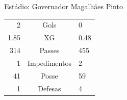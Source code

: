 \documentclass[11pt]{article}
\begin{document}
\vspace{0.5cm}
\begin{minipage}{0.65\textwidth}
\begin{center}
\begin{tabular}{rl}
\end{tabular}
\end{center}
\end{minipage}
\begin{minipage}{0.3\textwidth}
Estádio: Governador Magalhães Pinto\\
\begin{tabular}{rcl}
2 & Gols & 0 \\
1.85 & XG & 0.48 \\
314 & Passes & 455 \\
1 & Impedimentos & 2 \\
41 & Posse & 59 \\
1 & Defesas & 4 \\
\end{tabular}
\end{minipage}
\newpage
\end{document}
